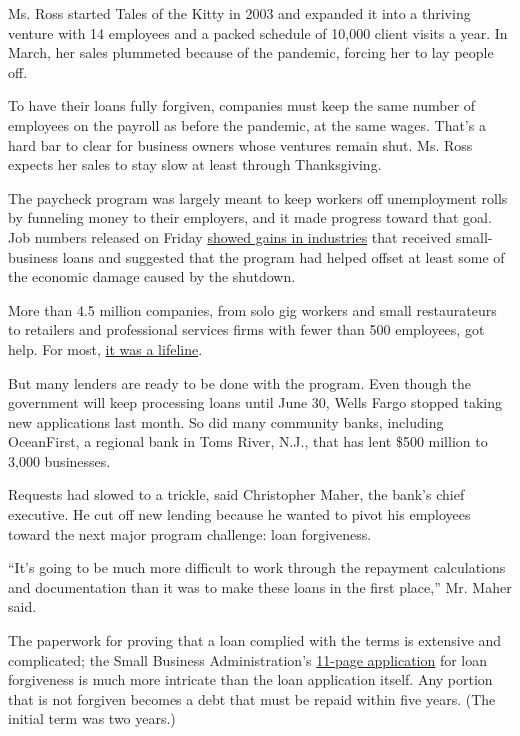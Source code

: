 Ms. Ross started Tales of the Kitty in 2003 and expanded it into a
thriving venture with 14 employees and a packed schedule of 10,000
client visits a year. In March, her sales plummeted because of the
pandemic, forcing her to lay people off.

To have their loans fully forgiven, companies must keep the same number
of employees on the payroll as before the pandemic, at the same wages.
That's a hard bar to clear for business owners whose ventures remain
shut. Ms. Ross expects her sales to stay slow at least through
Thanksgiving.

The paycheck program was largely meant to keep workers off unemployment
rolls by funneling money to their employers, and it made progress toward
that goal. Job numbers released on Friday
\href{https://www.nytimes3xbfgragh.onion/2020/06/05/business/economy/jobs-report.html}{showed
gains in industries} that received small-business loans and suggested
that the program had helped offset at least some of the economic damage
caused by the shutdown.

More than 4.5 million companies, from solo gig workers and small
restaurateurs to retailers and professional services firms with fewer
than 500 employees, got help. For most,
\href{https://www.nytimes3xbfgragh.onion/2020/05/31/business/virus-ppp-loan-small-businesses.html}{it
was a lifeline}.

But many lenders are ready to be done with the program. Even though the
government will keep processing loans until June 30, Wells Fargo stopped
taking new applications last month. So did many community banks,
including OceanFirst, a regional bank in Toms River, N.J., that has lent
\$500 million to 3,000 businesses.

Requests had slowed to a trickle, said Christopher Maher, the bank's
chief executive. He cut off new lending because he wanted to pivot his
employees toward the next major program challenge: loan forgiveness.

``It's going to be much more difficult to work through the repayment
calculations and documentation than it was to make these loans in the
first place,'' Mr. Maher said.

The paperwork for proving that a loan complied with the terms is
extensive and complicated; the Small Business Administration's
\href{https://www.sba.gov/sites/default/files/2020-05/3245-0407\%20SBA\%20Form\%203508\%20PPP\%20Forgiveness\%20Application.pdf}{11-page
application} for loan forgiveness is much more intricate than the loan
application itself. Any portion that is not forgiven becomes a debt that
must be repaid within five years. (The initial term was two years.)

